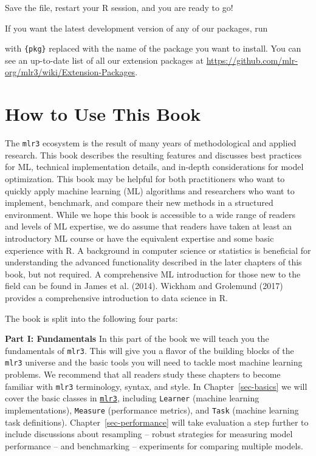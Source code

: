 Save the file, restart your R session, and you are ready to go!

If you want the latest development version of any of our packages, run

\begin{Shaded}
\begin{Highlighting}[]
\SpecialCharTok{::}\NormalTok{(}\NormalTok{)}
\end{Highlighting}
\end{Shaded}

with \texttt{\{pkg\}} replaced with the name of the package you want to
install. You can see an up-to-date list of all our extension packages at
\url{https://github.com/mlr-org/mlr3/wiki/Extension-Packages}.

\hypertarget{howtouse}{%
\section{How to Use This Book}\label{howtouse}}

The \texttt{mlr3} ecosystem is the result of many years of
methodological and applied research. This book describes the resulting
features and discusses best practices for ML, technical implementation
details, and in-depth considerations for model optimization. This book
may be helpful for both practitioners who want to quickly apply machine
learning (ML) algorithms and researchers who want to implement,
benchmark, and compare their new methods in a structured environment.
While we hope this book is accessible to a wide range of readers and
levels of ML expertise, we do assume that readers have taken at least an
introductory ML course or have the equivalent expertise and some basic
experience with R. A background in computer science or statistics is
beneficial for understanding the advanced functionality described in the
later chapters of this book, but not required. A comprehensive ML
introduction for those new to the field can be found in James et al.
(2014). Wickham and Grolemund (2017) provides a comprehensive
introduction to data science in R.

The book is split into the following four parts:

\textbf{Part I: Fundamentals} In this part of the book we will teach you
the fundamentals of \texttt{mlr3}. This will give you a flavor of the
building blocks of the \texttt{mlr3} universe and the basic tools you
will need to tackle most machine learning problems. We recommend that
all readers study these chapters to become familiar with \texttt{mlr3}
terminology, syntax, and style. In Chapter~\ref{sec-basics} we will
cover the basic classes in
\href{https://mlr3.mlr-org.com}{\texttt{mlr3}},
including \texttt{Learner} (machine learning implementations),
\texttt{Measure} (performance metrics), and \texttt{Task} (machine
learning task definitions). Chapter~\ref{sec-performance} will take
evaluation a step further to include discussions about resampling --
robust strategies for measuring model performance -- and benchmarking --
experiments for comparing multiple models.

